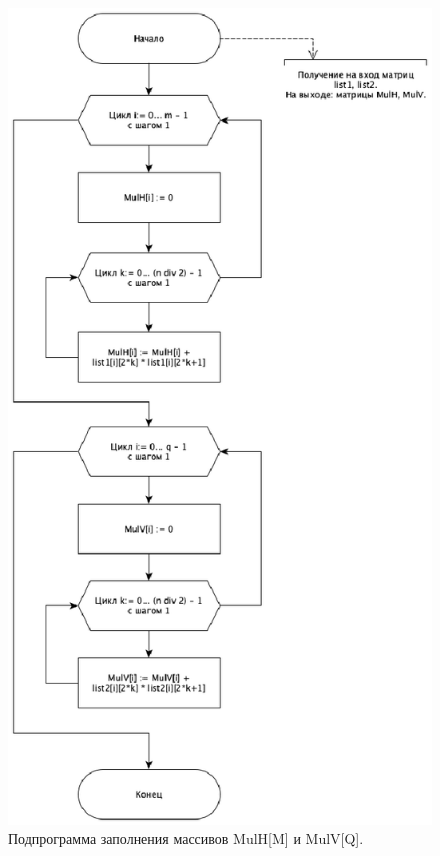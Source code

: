 \documentclass[12pt]{report}
\begin{document}
\begin{figure}[H]
	\centering
	\includegraphics[width=0.8\linewidth]{Grape_MulHV}
	\caption{Подпрограмма заполнения массивов MulH[M] и MulV[Q].}
	\label{ris:image5}
\end{figure}

\newpage
\end{document}

